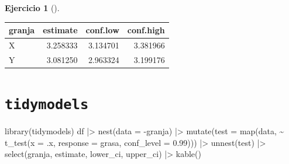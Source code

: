 \documentclass[
  a4paper,
]{scrreport}
\newenvironment{Shaded}{\begin{snugshade}}{\end{snugshade}}
\newcommand{\AttributeTok}[1]{\textcolor[rgb]{0.40,0.45,0.13}{#1}}
\newcommand{\FloatTok}[1]{\textcolor[rgb]{0.68,0.00,0.00}{#1}}
\newcommand{\FunctionTok}[1]{\textcolor[rgb]{0.28,0.35,0.67}{#1}}
\newcommand{\NormalTok}[1]{\textcolor[rgb]{0.00,0.23,0.31}{#1}}
\newcommand{\OtherTok}[1]{\textcolor[rgb]{0.00,0.23,0.31}{#1}}
\newcommand{\SpecialCharTok}[1]{\textcolor[rgb]{0.37,0.37,0.37}{#1}}
\theoremstyle{definition}
\newtheorem{exercise}{Ejercicio}[chapter]
\theoremstyle{remark}
\begin{document}
\begin{exercise}[]
\begin{enumerate}
\begin{tcolorbox}
\begin{Shaded}
\end{Shaded}

  \begin{longtable}[]{@{}lrrr@{}}
  \toprule\noalign{}
  granja & estimate & conf.low & conf.high \\
  \midrule\noalign{}
  \endhead
  \bottomrule\noalign{}
  \endlastfoot
  X & 3.258333 & 3.134701 & 3.381966 \\
  Y & 3.081250 & 2.963324 & 3.199176 \\
  \end{longtable}

  \section{\texorpdfstring{\texttt{tidymodels}}{tidymodels}}

\begin{Shaded}
\begin{Highlighting}[]
\FunctionTok{library}\NormalTok{(tidymodels)}
\NormalTok{df }\SpecialCharTok{|\textgreater{}} 
    \FunctionTok{nest}\NormalTok{(}\AttributeTok{data =} \SpecialCharTok{{-}}\NormalTok{granja) }\SpecialCharTok{|\textgreater{}} 
    \FunctionTok{mutate}\NormalTok{(}\AttributeTok{test =} \FunctionTok{map}\NormalTok{(data, }\SpecialCharTok{\textasciitilde{}} \FunctionTok{t\_test}\NormalTok{(}\AttributeTok{x =}\NormalTok{ .x, }\AttributeTok{response =}\NormalTok{ grasa, }\AttributeTok{conf\_level =} \FloatTok{0.99}\NormalTok{))) }\SpecialCharTok{|\textgreater{}} 
    \FunctionTok{unnest}\NormalTok{(test) }\SpecialCharTok{|\textgreater{}} 
    \FunctionTok{select}\NormalTok{(granja, estimate, lower\_ci, upper\_ci) }\SpecialCharTok{|\textgreater{}} 
    \FunctionTok{kable}\NormalTok{()}
\end{Highlighting}
\end{Shaded}


\end{tcolorbox}
\end{enumerate}
\end{exercise}
\end{document}
